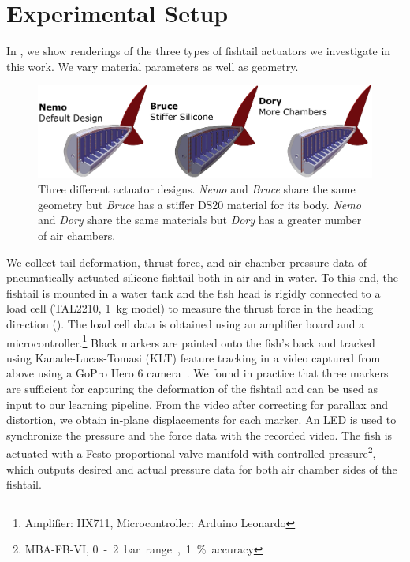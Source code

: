 \section{Experimental Setup}
\label{experimental_setup}

In , we show renderings of the three types of fishtail actuators we investigate in this work. We vary material parameters as well as geometry.

\begin{figure}
    \centering
    \includegraphics[width=\linewidth]{figures_appendix/fish_CAD_horiz.png}
    \caption{Three different actuator designs. \emph{Nemo} and \emph{Bruce} share the same geometry but \emph{Bruce} has a stiffer DS20 material for its body. \emph{Nemo} and \emph{Dory} share the same materials but \emph{Dory} has a greater number of air chambers.}
    \label{fig:fish_CAD}
\end{figure}

We collect tail deformation, thrust force, and air chamber pressure data of pneumatically actuated silicone fishtail both in air and in water. To this end, the fishtail is mounted in a water tank and the fish head is rigidly connected to a load cell (TAL2210, \SI{1}{kg} model) to measure the thrust force in the heading direction (). The load cell data is obtained using an amplifier board and a microcontroller.\footnote{Amplifier: HX711, Microcontroller: Arduino Leonardo} Black markers are painted onto the fish’s back and tracked using Kanade-Lucas-Tomasi (KLT) feature tracking in a video captured from above using a GoPro Hero 6 camera~\cite{lucas1981iterative,tomasi1991tracking}. We found in practice that three markers are sufficient for capturing the deformation of the fishtail and can be used as input to our learning pipeline. From the video after correcting for parallax and distortion, we obtain in-plane displacements for each marker. An LED is used to synchronize the pressure and the force data with the recorded video. The fish is actuated with a Festo proportional valve manifold with controlled pressure\footnote{MBA-FB-VI, \SI{0}-\SI{2}{bar} range, 1\% accuracy}, which outputs desired and actual pressure data for both air chamber sides of the fishtail.

